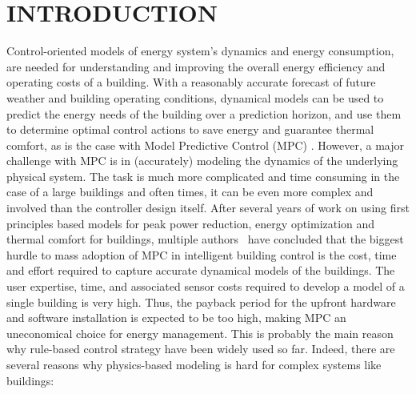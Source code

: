 \section{INTRODUCTION}

\label{S:intro}



\textcolor[rgb]{0,0,1}{Control-oriented models of energy system's dynamics and energy consumption, are needed for understanding and improving the overall energy efficiency and operating costs of a building.
With a reasonably accurate forecast of future weather and building operating conditions, dynamical models can be used to predict the energy needs of the building over a prediction horizon, and use them to determine optimal control actions to save energy and guarantee thermal comfort, as is the case with Model Predictive Control (MPC) \cite{Sturzenegger2016}.
However, a major challenge with MPC is in (accurately) modeling the dynamics of the underlying physical system.
The task is much more complicated and time consuming in the case of a large buildings and often times, it can be even more complex and involved than the controller design itself.
After several years of work on using first principles based models for peak power reduction, energy optimization and thermal comfort for buildings, multiple authors~\cite{Sturzenegger2016, vzavcekova2014} have concluded that the biggest hurdle to mass adoption of MPC in intelligent building control is the cost, time and effort required to capture accurate dynamical models of the buildings.
The user expertise, time, and associated sensor costs required to develop a model of a single building is very high. Thus, the payback period for the upfront hardware and software installation is expected to be too high, making MPC an uneconomical choice for energy management. This is probably the main reason why rule-based control strategy have been widely used so far. Indeed, there are several reasons why physics-based modeling is hard for complex systems like buildings:}

